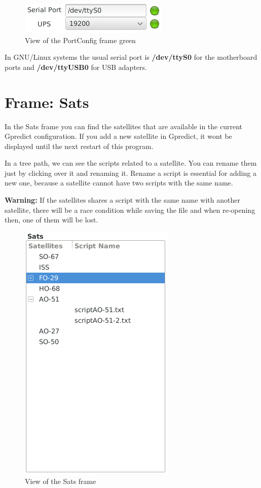 \documentclass[pdftex,11pt,a4paper,titlepage]{report}
\begin{document}
\begin{figure}[h]
\centering
\includegraphics[scale=0.9]{../images/PortConfigFrameGreen.png}
\caption{View of the PortConfig frame green}
\label{PortConfigFrameGreen}
\end{figure}

In GNU/Linux systems the usual serial port is \textbf{/dev/ttyS0} for the motherboard ports and \textbf{/dev/ttyUSB0} for USB adapters. 

\chapter{Frame: Sats}
\hspace{0.4cm} In the Sats frame you can find the satellites that are available in the current Gpredict configuration. If you add a new satellite in Gpredict, it wont be displayed until the next restart of this program.

In a tree path, we can see the scripts related to a satellite. You can rename them just by clicking over it and renaming it. Rename a script is essential for adding a new one, because a satellite cannot have two scripts with the same name. 

\textbf{Warning:} If the satellites shares a script with the same name with another satellite, there will be a race condition while saving the file and when re-opening then, one of them will be lost. 
\begin{figure}[h]
\centering
\includegraphics[scale=0.8]{../images/SatsFrame.png}
\caption{View of the Sats frame}
\label{SatsFrame}
\end{figure}
\end{document}
